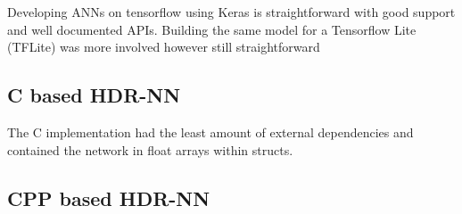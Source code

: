 Developing ANNs on tensorflow using Keras is straightforward with good support and well documented APIs. Building the same model for a Tensorflow Lite (TFLite) was more involved however still straightforward

\subsection[C]{C based HDR-NN}

The C implementation had the least amount of external dependencies and contained the network in float arrays within structs.

\subsection[CPP - Eigen]{CPP based HDR-NN}
